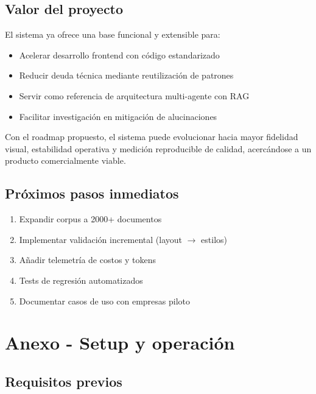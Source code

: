\documentclass[12pt,a4paper]{article}
\begin{document}
\subsection{Valor del proyecto}

El sistema ya ofrece una base funcional y extensible para:

\begin{itemize}
    \item Acelerar desarrollo frontend con código estandarizado
    \item Reducir deuda técnica mediante reutilización de patrones
    \item Servir como referencia de arquitectura multi-agente con RAG
    \item Facilitar investigación en mitigación de alucinaciones
\end{itemize}

Con el roadmap propuesto, el sistema puede evolucionar hacia mayor fidelidad visual, estabilidad operativa y medición reproducible de calidad, acercándose a un producto comercialmente viable.

\subsection{Próximos pasos inmediatos}

\begin{enumerate}
    \item Expandir corpus a 2000+ documentos
    \item Implementar validación incremental (layout $\rightarrow$ estilos)
    \item Añadir telemetría de costos y tokens
    \item Tests de regresión automatizados
    \item Documentar casos de uso con empresas piloto
\end{enumerate}

\section{Anexo - Setup y operación}

\subsection{Requisitos previos}
\end{document}
